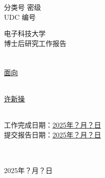 \pagestyle{empty}

{\noindent
\fontsize{16}{16}\selectfont
分类号\uline{\qquad\qquad\qquad\qquad}
\qquad\qquad
密级\uline{\qquad\qquad\qquad\qquad}\\

\noindent
{
    UDC
}
\uline{\qquad\qquad\qquad\qquad}
\qquad\qquad
编号\uline{\qquad\qquad\qquad\qquad}
}

\vspace{40mm}

\begin{center}
    \fontsize{26}{26}\selectfont
    \kaiti 电子科技大学\\
    博士后研究工作报告\\
    \quad\\
    \quad\\
    \uline{面向}
\end{center}

\begin{center}
    \fontsize{16}{16}\selectfont
    \quad\\
    \uline{许新操}
    \quad\\
    \quad\\
    \quad
\end{center}

{
    \fontsize{16}{16}\selectfont
    \noindent
    工作完成日期：\uline{2025年？月？日}\\

    \noindent
    提交报告日期：\uline{2025年？月？日}
}

\begin{center}
    \fontsize{16}{16}\selectfont
    \quad\\
    \quad\\
    2025年？月？日
\end{center}

\clearpage